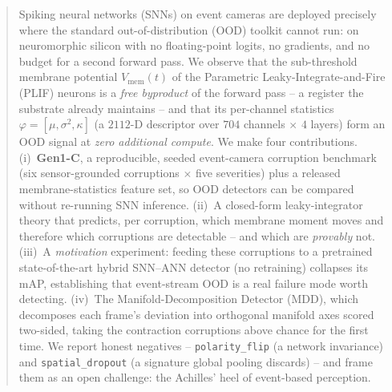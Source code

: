 \begin{abstract}
Spiking neural networks (SNNs) on event cameras are deployed precisely where the
standard out-of-distribution (OOD) toolkit cannot run: on neuromorphic silicon with no
floating-point logits, no gradients, and no budget for a second forward pass. We observe
that the sub-threshold membrane potential $V_{\mathrm{mem}}(t)$ of the Parametric
Leaky-Integrate-and-Fire (PLIF) neurons is a \emph{free byproduct} of the forward pass --
a register the substrate already maintains -- and that its per-channel statistics
$\varphi=[\mu,\sigma^2,\kappa]$ (a $2112$-D descriptor over $704$ channels $\times$ $4$
layers) form an OOD signal at \emph{zero additional compute}. We make four contributions.
(i)~\textbf{Gen1-C}, a reproducible, seeded event-camera corruption benchmark (six
sensor-grounded corruptions $\times$ five severities) plus a released membrane-statistics
feature set, so OOD detectors can be compared without re-running SNN inference.
(ii)~A closed-form leaky-integrator theory that predicts, per corruption, which membrane
moment moves and therefore which corruptions are detectable -- and which are
\emph{provably} not. (iii)~A \emph{motivation} experiment: feeding these corruptions to a
pretrained state-of-the-art hybrid SNN--ANN detector (no retraining) collapses its mAP,
establishing that event-stream OOD is a real failure mode worth detecting. (iv)~The
Manifold-Decomposition Detector (MDD), which decomposes each frame's deviation into
orthogonal manifold axes scored two-sided, taking the contraction corruptions above chance
for the first time. We report honest negatives -- \texttt{polarity\_flip} (a network
invariance) and \texttt{spatial\_dropout} (a signature global pooling discards) -- and
frame them as an open challenge: the Achilles' heel of event-based perception.
\end{abstract}
